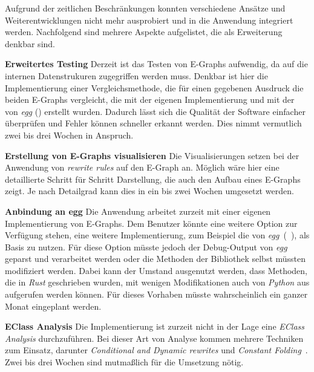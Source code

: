 Aufgrund der zeitlichen Beschränkungen konnten verschiedene Ansätze und Weiterentwicklungen nicht mehr ausprobiert und in die Anwendung integriert werden.
Nachfolgend sind mehrere Aspekte aufgelistet, die als Erweiterung denkbar sind. 

\textbf{Erweitertes Testing} Derzeit ist das Testen von E-Graphs aufwendig, da auf die internen Datenstrukuren zugegriffen werden muss.
Denkbar ist hier die Implementierung einer Vergleichsmethode, die für einen gegebenen Ausdruck die beiden E-Graphs vergleicht,
die mit der eigenen Implementierung und mit der von \textit{egg} (\cite{2021-egg}) erstellt wurden. 
Dadurch lässt sich die Qualität der Software einfacher überprüfen und Fehler können schneller erkannt werden.
Dies nimmt vermutlich zwei bis drei Wochen in Anspruch.

\textbf{Erstellung von E-Graphs visualisieren} Die Visualisierungen setzen bei der Anwendung von \textit{rewrite rules} auf den E-Graph an.
Möglich wäre hier eine detaillierte Schritt für Schritt Darstellung, die auch den Aufbau eines E-Graphs zeigt. 
Je nach Detailgrad kann dies in ein bis zwei Wochen umgesetzt werden.

\textbf{Anbindung an egg} Die Anwendung arbeitet zurzeit mit einer eigenen Implementierung von E-Graphs. Dem Benutzer könnte eine weitere Option zur Verfügung stehen, eine weitere
Implementierung, zum Beispiel die von \textit{egg}~(~\cite{2021-egg}), als Basis zu nutzen.
Für diese Option müsste jedoch der Debug-Output von \textit{egg} geparst und verarbeitet werden oder die Methoden der Bibliothek selbst müssten modifiziert werden.
Dabei kann der Umstand ausgenutzt werden, dass Methoden, die in \textit{Rust} geschrieben wurden, mit wenigen Modifikationen auch von \textit{Python} aus aufgerufen werden können.
Für dieses Vorhaben müsste wahrscheinlich ein ganzer Monat eingeplant werden.

\textbf{EClass Analysis}
Die Implementierung ist zurzeit nicht in der Lage eine \textit{EClass Analysis} durchzuführen. Bei dieser Art von Analyse kommen mehrere Techniken zum Einsatz, darunter
\textit{Conditional and Dynamic rewrites} und \textit{Constant Folding}~\cite{2021-egg}. Zwei bis drei Wochen sind mutmaßlich für die Umsetzung nötig.
